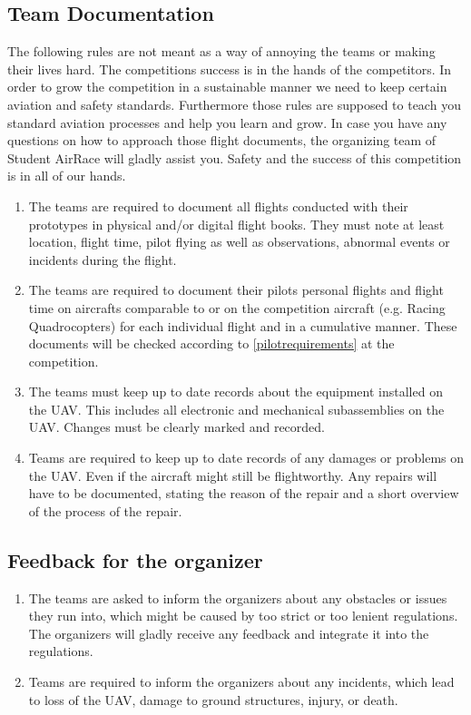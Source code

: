     \subsection{Team Documentation}
    The following rules are not meant as a way of annoying the teams or making their lives hard. The competitions success is in the hands of the competitors. In order to grow the competition 
    in a sustainable manner we need to keep certain aviation and safety standards. Furthermore those rules are supposed to teach you standard aviation processes and help you learn and grow. 
    In case you have any questions on how to approach those flight documents, the organizing team of Student AirRace will gladly assist you. Safety and the success of this competition is in all of our hands.
    \begin{enumerate}
      \item The teams are required to document all flights conducted with their prototypes in physical and/or digital flight books. They must note at least location, flight time, pilot flying 
      as well as observations, abnormal events or incidents during the flight.
      \item The teams are required to document their pilots personal flights and flight time on aircrafts comparable to or on the competition aircraft (e.g. Racing Quadrocopters)
      for each individual flight and in a cumulative manner. These documents will be checked according to \ref{pilotrequirements} at the competition. 
      \item The teams must keep up to date records about the equipment installed on the UAV. This includes all electronic and mechanical subassemblies on the UAV. 
      Changes must be clearly marked and recorded. 
      \item Teams are required to keep up to date records of any damages or problems on the UAV. Even if the aircraft might still be flightworthy. 
      Any repairs will have to be documented, stating the reason of the repair and a short overview of the process of the repair. 
    \end{enumerate}

    \subsection{Feedback for the organizer}
    \begin{enumerate}
      \item The teams are asked to inform the organizers about any obstacles or issues they run into, which might be caused by
      too strict or too lenient regulations. The organizers will gladly receive any feedback and integrate it into the regulations. 
      \item Teams are required to inform the organizers about any incidents, which lead to loss of the UAV, damage to ground structures, injury, or death. 
    \end{enumerate}



